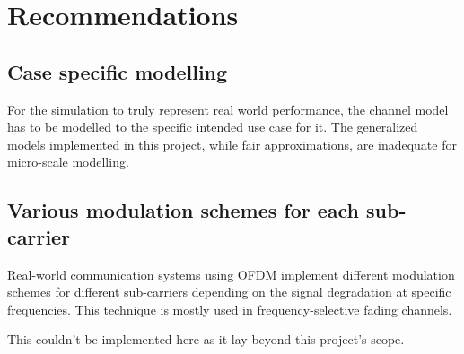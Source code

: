 \section{Recommendations}
\subsection{Case specific modelling}
For the simulation to truly represent real world performance, the channel model has to be modelled to the specific intended use case for it. The generalized models implemented in this project, while fair approximations, are inadequate for micro-scale modelling.

\subsection{Various modulation schemes for each sub-carrier}
Real-world communication systems using OFDM implement different modulation schemes for different sub-carriers depending on the signal degradation at specific frequencies. This technique is mostly used in frequency-selective fading channels.

This couldn't be implemented here as it lay beyond this project's scope.
